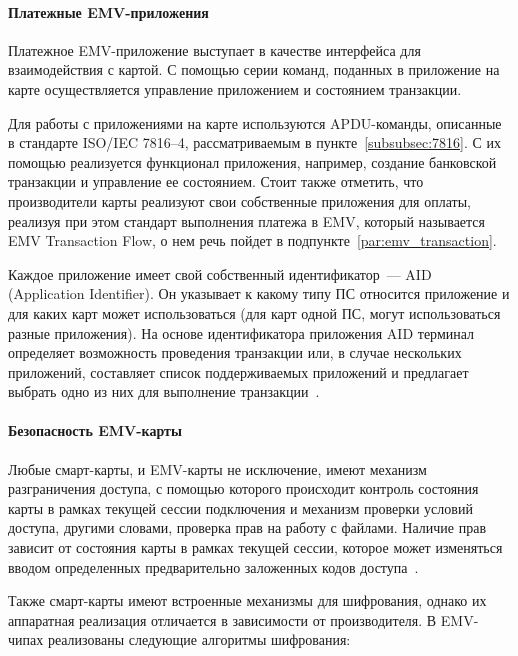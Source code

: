 \paragraph{Платежные EMV-приложения}

Платежное EMV-приложение выступает в качестве интерфейса для взаимодействия с картой.
С помощью серии команд, поданных в приложение на карте осуществляется управление приложением и состоянием транзакции.

Для работы с приложениями на карте используются APDU-команды, описанные в стандарте ISO/IEC 7816--4, рассматриваемым в пункте~\ref{subsubsec:7816}.
С их помощью реализуется функционал приложения, например, создание банковской транзакции и управление ее состоянием.
Стоит также отметить, что производители карты реализуют свои собственные приложения для оплаты, реализуя при этом стандарт выполнения платежа в EMV, который называется EMV Transaction Flow, о нем речь пойдет в подпункте~\ref{par:emv_transaction}.

Каждое приложение имеет свой собственный идентификатор~--- AID (Application Identifier).
Он указывает к какому типу ПС относится приложение и для каких карт может использоваться (для карт одной ПС, могут использоваться разные приложения).
На основе идентификатора приложения AID терминал определяет возможность проведения транзакции или, в случае нескольких приложений, составляет список поддерживаемых приложений и предлагает выбрать одно из них для выполнение транзакции~\cite{emv_card_mechanism}.

\paragraph{Безопасность EMV-карты}

Любые смарт-карты, и EMV-карты не исключение, имеют механизм разграничения доступа, с помощью которого происходит контроль состояния карты в рамках текущей сессии подключения и механизм проверки условий доступа, другими словами, проверка прав на работу с файлами.
Наличие прав зависит от состояния карты в рамках текущей сессии, которое может изменяться вводом определенных предварительно заложенных кодов доступа~\cite{habr_smart_card_for_little}.

Также смарт-карты имеют встроенные механизмы для шифрования, однако их аппаратная реализация отличается в зависимости от производителя.
В EMV-чипах реализованы следующие алгоритмы шифрования:

